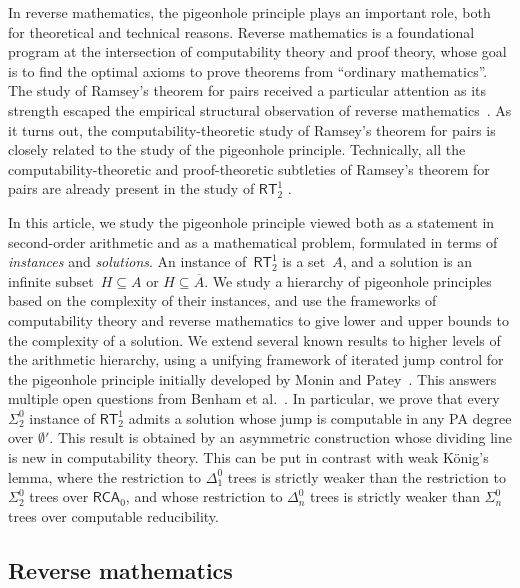 \documentclass{article}
\newcommand{\RCA}{\mathsf{RCA}}
\newcommand{\RT}{\mathsf{RT}}
\def\qt#1{``#1''}%
\numberwithin{theorem}{section}
\theoremstyle{definition}
\begin{document}
In reverse mathematics, the pigeonhole principle plays an important role, both for theoretical and technical reasons. Reverse mathematics is a foundational program at the intersection of computability theory and proof theory, whose goal is to find the optimal axioms to prove theorems from \qt{ordinary mathematics}. The study of Ramsey's theorem for pairs received a particular attention as its strength escaped the empirical structural observation of reverse mathematics~\cite{hirschfeldt2015slicing}. As it turns out, the computability-theoretic study of Ramsey's theorem for pairs is closely related to the study of the pigeonhole principle. Technically, all the computability-theoretic and proof-theoretic subtleties of Ram\-sey's theorem for pairs are already present in the study of $\RT^1_2$ \cite{cholak2001strength,dzhafarov2009ramsey,liu2012rt22,liu2015cone}.

In this article, we study the pigeonhole principle viewed both as a statement in second-order arithmetic and as a mathematical problem, formulated in terms of \emph{instances} and \emph{solutions}. An instance of~$\RT^1_2$ is a set~$A$, and a solution is an infinite subset~$H \subseteq A$ or $H \subseteq \overline{A}$. We study a hierarchy of pigeonhole principles based on the complexity of their instances, and use the frameworks of computability theory and reverse mathematics to give lower and upper bounds to the complexity of a solution. We extend several known results to higher levels of the arithmetic hierarchy, using a unifying framework of iterated jump control for the pigeonhole principle initially developed by Monin and Patey~\cite{monin201pigeons,monin2021weakness}. This answers multiple open questions from Benham et al.~\cite{benham2024ginsburg}. In particular, we prove that every $\Sigma^0_2$ instance of $\RT^1_2$ admits a solution whose jump is computable in any PA degree over $\emptyset'$. This result is obtained by an asymmetric construction whose dividing line is new in computability theory. This can be put in contrast with weak K\"onig's lemma, where the restriction to $\Delta^0_1$ trees is strictly weaker than the restriction to $\Sigma^0_2$ trees over $\RCA_0$, and whose restriction to $\Delta^0_n$ trees is strictly weaker than $\Sigma^0_n$ trees over computable reducibility.

\subsection{Reverse mathematics}
\end{document}
